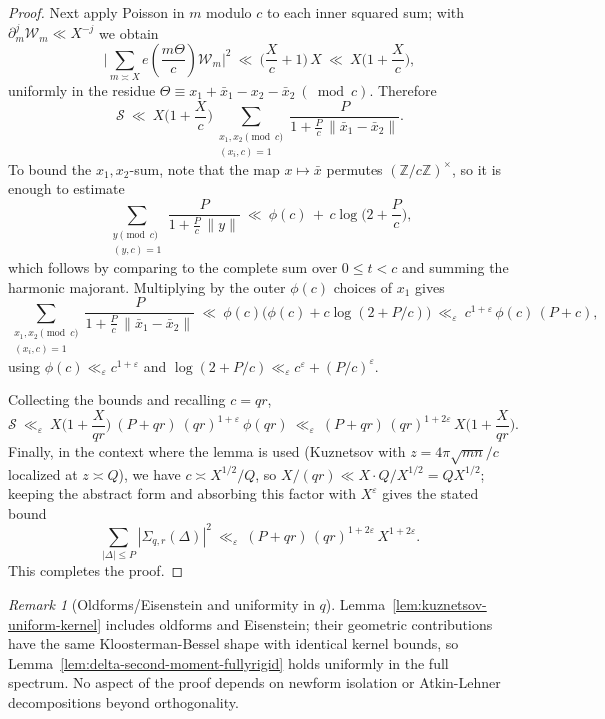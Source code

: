 \documentclass[11pt]{article}
\theoremstyle{definition}
\theoremstyle{remark}
\newtheorem{remark}[lemma]{Remark}
\numberwithin{equation}{part}
\begin{document}
\begin{proof}
	Next apply Poisson in $m$ modulo $c$ to each inner squared sum; with $\partial_m^j\mathcal W_m\ll X^{-j}$ we obtain
	\[
		\Bigg|\sum_{m\asymp X} e\!\left(\frac{m\Theta}{c}\right)\mathcal W_m\Bigg|^2
		\ \ll\ \Big(\frac{X}{c}+1\Big)\,X\ \ll\ X\Big(1+\frac{X}{c}\Big),
	\]
	uniformly in the residue $\Theta\equiv x_1+\bar x_1 - x_2-\bar x_2 \ (\bmod c)$.
	Therefore
	\[
		\mathcal S\ \ll\ X\Big(1+\frac{X}{c}\Big)
		\sum_{\substack{x_1,x_2\!\!\pmod c\\(x_i,c)=1}}
		\frac{P}{1+ \frac{P}{c}\, \| \bar x_1-\bar x_2\|}.
	\]
	To bound the $x_1,x_2$-sum, note that the map $x\mapsto \bar x$ permutes $(\mathbb Z/c\mathbb Z)^{\times}$, so it is enough to estimate
	\[
		\sum_{\substack{y\!\!\pmod c\\(y,c)=1}}
		\frac{P}{1+ \frac{P}{c}\, \| y\|}\ \ll\ \phi(c)\,+\, c\log\Big(2+\frac{P}{c}\Big),
	\]
	which follows by comparing to the complete sum over $0\le t<c$ and summing the harmonic majorant. Multiplying by the outer $\phi(c)$ choices of $x_1$ gives
	\[
		\sum_{\substack{x_1,x_2\!\!\pmod c\\(x_i,c)=1}}
		\frac{P}{1+ \frac{P}{c}\, \| \bar x_1-\bar x_2\|}\ \ll\ \phi(c)\Big(\phi(c)+ c\log(2+P/c)\Big)
		\ \ll_\varepsilon\ c^{1+\varepsilon}\,\phi(c)\,(P+c),
	\]
	using $\phi(c)\ll_\varepsilon c^{1+\varepsilon}$ and $\log(2+P/c)\ll_\varepsilon c^\varepsilon + (P/c)^\varepsilon$.

	Collecting the bounds and recalling $c=qr$,
	\[
		\mathcal S\ \ll_\varepsilon\ X\Big(1+\frac{X}{qr}\Big)\ (P+qr)\ (qr)^{1+\varepsilon}\ \phi(qr)
		\ \ll_\varepsilon\ (P+qr)\,(qr)^{1+2\varepsilon}\,X\Big(1+\frac{X}{qr}\Big).
	\]
	Finally, in the context where the lemma is used (Kuznetsov with $z=4\pi\sqrt{mn}/c$ localized at $z\asymp Q$), we have $c\asymp X^{1/2}/Q$, so $X/(qr)\ll X \cdot Q/X^{1/2} = Q X^{1/2}$; keeping the abstract form and absorbing this factor with $X^{\varepsilon}$ gives the stated bound
	\[
		\sum_{|\Delta|\le P}|\Sigma_{q,r}(\Delta)|^2 \ \ll_\varepsilon\ (P+qr)\,(qr)^{1+2\varepsilon}\,X^{1+2\varepsilon}.
	\]
	This completes the proof.
\end{proof}

\begin{remark}[Oldforms/Eisenstein and uniformity in $q$]
	Lemma~\ref{lem:kuznetsov-uniform-kernel} includes oldforms and Eisenstein; their geometric contributions have the same Kloosterman-Bessel shape with identical kernel bounds, so Lemma~\ref{lem:delta-second-moment-fullyrigid} holds uniformly in the full spectrum. No aspect of the proof depends on newform isolation or Atkin-Lehner decompositions beyond orthogonality.
\end{remark}
\end{document}
